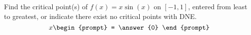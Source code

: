 \documentclass{ximera}
\author{Gregory Hartman \and Matthew Carr}
\begin{document}
\begin{exercise}






Find the critical point(s) of $f(x)=x\sin(x)$ on $[-1,1]$, entered from least to greatest, or indicate there exist no critical points with DNE.
\[
x
\begin{prompt}
= \answer{0}
\end{prompt}
\]

\end{exercise}
\end{document}
